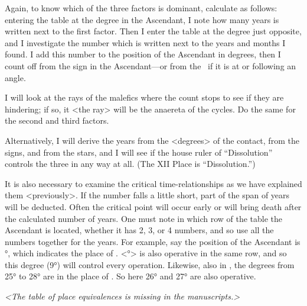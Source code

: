 Again, to know which of the three factors is dominant, calculate as follows: entering the table at the degree in the Ascendant, I note how many years is written next to the first factor. Then I enter the table at
the degree just opposite, and I investigate the number which is written next to the years and months I found. I add this number to the position of the Ascendant in degrees, then I count off from the sign in the
Ascendant—or from the \Moon\, if it is at or following an angle. 

I will look at the rays of the malefics where the count stops to see if they are hindering; if so, it <the ray> will be the anaereta of the cycles. Do the same for the second and third factors.

Alternatively, I will derive the years from the <degrees> of the contact, from the signs, and from the stars, and I will see if the house ruler of “Dissolution” controls the three in any way at all. (The XII Place
is “Dissolution.”) 

It is also necessary to examine the critical time-relationships as we have explained them <previously>. If the number falls a little short, part of the span of years will be deducted. Often the critical
point will occur early or will bring death after the calculated number of years. One must note in which row of the table the Ascendant is located, whether it has 2, 3, or 4 numbers, and so use all the numbers together for the years. For example, say the position of the Ascendant is \Cancer\xspace 8°, which indicates the place of \Taurus. <\Cancer\xspace 9°> is also operative in the same row, and so this degree (9°) will control every operation. Likewise, also in \Cancer, the degrees from 25° to 28° are in the place of \Aquarius. So here 26°
and 27° are also operative.

\textit{<The table of place equivalences is missing in the manuscripts.>}
\newpage